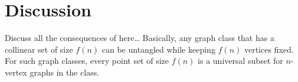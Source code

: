 \documentclass{patmorin}
\begin{document}
\section{Discussion}

Discuss all the consequences of  here\ldots
Basically, any graph class that has a collinear set of size $f(n)$ can 
be untangled while keeping $f(n)$ vertices fixed.  For such graph classes,
every point set of size $f(n)$ is a universal subset for $n$-vertex graphs
in the class.
\end{document}
